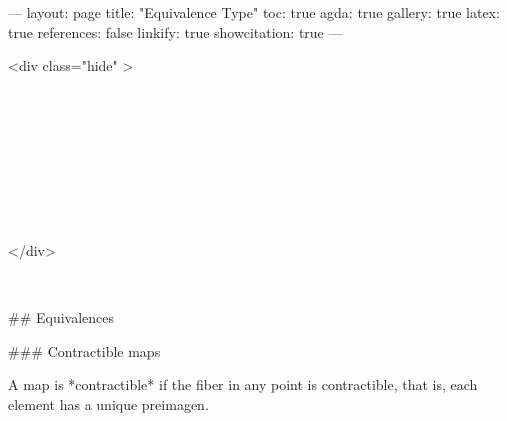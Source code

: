 ---
layout: page
title: "Equivalence Type"
toc: true
agda: true
gallery: true
latex: true
references: false
linkify: true
showcitation: true
---

<div class="hide" >
\begin{code}%
\>[0]\AgdaSymbol{\{-\#}\AgdaSpace{}%
\AgdaSpace{}%
\AgdaSpace{}%
\AgdaSymbol{\#-\}}\<%
\\
\>[0]\AgdaSpace{}%
\AgdaSpace{}%
\<%
\\
\>[0]\AgdaSpace{}%
\AgdaSpace{}%
\<%
\\
\>[0]\AgdaSpace{}%
\AgdaSpace{}%
\<%
\\
%
\\[\AgdaEmptyExtraSkip]%
\>[0]\AgdaSpace{}%
\AgdaSpace{}%
\<%
\\
\>[0]\AgdaSpace{}%
\AgdaSpace{}%
\<%
\\
\>[0]\<%
\end{code}
</div>

\begin{code}%
\>[0]\AgdaSpace{}%
\AgdaSpace{}%
\<%
\\
\>[0]\<%
\end{code}

## Equivalences

### Contractible maps

A map is *contractible* if the fiber in any point is contractible, that is, each
element has a unique preimagen.

